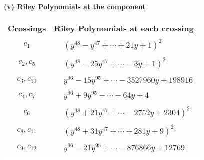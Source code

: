 \documentclass[1p]{elsarticle_modified}
\theoremstyle{definition}
\begin{document}
\flushleft \textbf{(v) Riley Polynomials at the component}\newline \\
\begin{tabular}{m{50pt}|m{274pt}}
Crossings & \hspace{64pt}Riley Polynomials at each crossing \\
\hline $$\begin{aligned}c_{1}\end{aligned}$$&$\begin{aligned}
&(y^{48}- y^{47}+\cdots+21 y+1)^{2}
\end{aligned}$\\
\hline $$\begin{aligned}c_{2},c_{5}\end{aligned}$$&$\begin{aligned}
&(y^{48}-25 y^{47}+\cdots-3 y+1)^{2}
\end{aligned}$\\
\hline $$\begin{aligned}c_{3},c_{10}\end{aligned}$$&$\begin{aligned}
&y^{96}-15 y^{95}+\cdots-3527960 y+198916
\end{aligned}$\\
\hline $$\begin{aligned}c_{4},c_{7}\end{aligned}$$&$\begin{aligned}
&y^{96}+9 y^{95}+\cdots+64 y+4
\end{aligned}$\\
\hline $$\begin{aligned}c_{6}\end{aligned}$$&$\begin{aligned}
&(y^{48}+21 y^{47}+\cdots-2752 y+2304)^{2}
\end{aligned}$\\
\hline $$\begin{aligned}c_{8},c_{11}\end{aligned}$$&$\begin{aligned}
&(y^{48}+31 y^{47}+\cdots+281 y+9)^{2}
\end{aligned}$\\
\hline $$\begin{aligned}c_{9},c_{12}\end{aligned}$$&$\begin{aligned}
&y^{96}-21 y^{95}+\cdots-876866 y+12769
\end{aligned}$\\
\hline
\end{tabular}\\~\\
\end{document}
